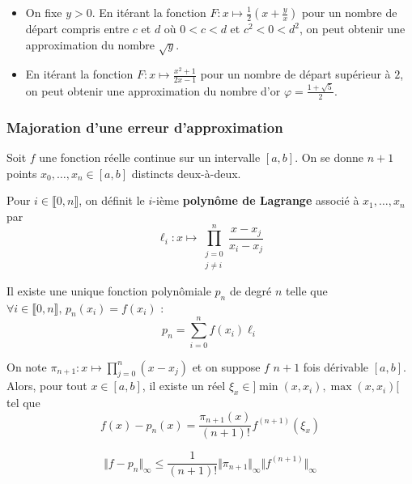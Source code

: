 	\begin{example}
  	\begin{itemize}
  		\item On fixe $y > 0$. En itérant la fonction $F : x \mapsto \frac{1}{2} \left( x + \frac{y}{x} \right)$ pour un nombre de départ compris entre $c$ et $d$ où $0 < c < d$ et $c^2 < 0 < d^2$, on peut obtenir une approximation du nombre $\sqrt{y}$.
  		\item En itérant la fonction $F : x \mapsto \frac{x^2+1}{2x-1}$ pour un nombre de départ supérieur à $2$, on peut obtenir une approximation du nombre d'or $\varphi = \frac{1+\sqrt{5}}{2}$.
  	\end{itemize}
  \end{example}

	\subsubsection{Majoration d'une erreur d'approximation}


	Soit $f$ une fonction réelle continue sur un intervalle $[a,b]$. On se donne $n+1$ points $x_0, \dots, x_n \in [a,b]$ distincts deux-à-deux.

	\begin{definition}
		Pour $i \in \llbracket 0, n \rrbracket$, on définit le $i$-ième \textbf{polynôme de Lagrange} associé à $x_1, \dots, x_n$ par
		\[ \ell_i : x \mapsto \prod_{\substack{j=0\\j \neq i}}^n \frac{x-x_j}{x_i-x_j} \]
	\end{definition}

	\begin{theorem}
		Il existe une unique fonction polynômiale $p_n$ de degré $n$ telle que $\forall i \in \llbracket 0, n \rrbracket, \, p_n(x_i) = f(x_i)$ :
		\[ p_n = \sum_{i=0}^n f(x_i) \ell_i \]
	\end{theorem}

	\begin{theorem}
		On note $\pi_{n+1} : x \mapsto \prod_{j=0}^{n} (x-x_j)$ et on suppose $f$ $n+1$ fois dérivable $[a,b]$. Alors, pour tout $x \in [a,b]$, il existe un réel $\xi_x \in ]\min(x,x_i),\max(x,x_i)[$ tel que
		\[ f(x)-p_n(x) = \frac{\pi_{n+1}(x)}{(n+1)!} f^{(n+1)}(\xi_x) \]
	\end{theorem}

	\begin{corollary}
		\[ \Vert f - p_n \Vert_\infty \leq \frac{1}{(n+1)!} \Vert \pi_{n+1} \Vert_\infty \Vert f^{(n+1)} \Vert_\infty \]
	\end{corollary}

